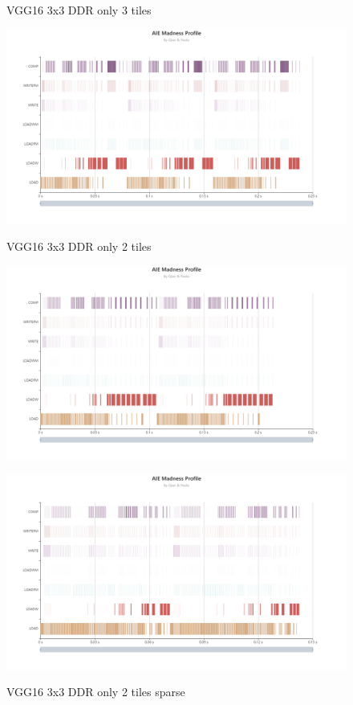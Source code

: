 \documentclass[conference]{IEEEtran}
\begin{document}
\begin{figure}[htb]
\centering 
\caption{VGG16 3x3 DDR only 3 tiles}
\includegraphics[width=0.99\linewidth]{vgg3tiles.png}
\label{vgg3tiles}
\caption{VGG16 3x3 DDR only 2 tiles}
\includegraphics[width=0.99\linewidth]{vgg2tiles.png}
\label{vgg2tiles}
\caption{VGG16 3x3 DDR only 2 tiles sparse}
\includegraphics[width=0.99\linewidth]{vgg2tilessparse.png}
\label{vgg2tilessparse}
\end{figure}
\newpage
\end{document}
